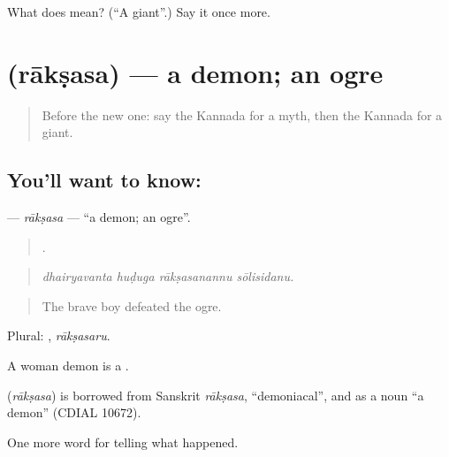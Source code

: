 \begin{tcolorbox}[breakable,colback=teal!4,colframe=teal!35!black,title={Before you move on}]
What does  mean? (\textquotedblleft{}A giant\textquotedblright{}.) Say it once more.
\end{tcolorbox}
\section[\texorpdfstring{\kn{ರಾಕ್ಷಸ} (rākṣasa)}{ರಾಕ್ಷಸ (rākṣasa)}]{ (rākṣasa) — a demon; an ogre}

\label{lesson:KA-C340-raksasa}



\begin{quote}
Before the new one: say the Kannada for a myth, then the Kannada for a giant.
\end{quote}

\subsection*{You'll want to know: }
\textbf{} — \emph{rākṣasa} — \textquotedblleft{}a demon; an ogre\textquotedblright{}.

\begin{quote}
   .
\end{quote}

\begin{quote}
\emph{dhairyavanta huḍuga rākṣasanannu sōlisidanu.}
\end{quote}

\begin{quote}
The brave boy defeated the ogre.
\end{quote}

Plural: , \emph{rākṣasaru}.

A woman demon is a .

\begin{cousinweb}
\textbf{} (\emph{rākṣasa}) is borrowed from Sanskrit \emph{rākṣasa}, \textquotedblleft{}demoniacal\textquotedblright{}, and as a noun \textquotedblleft{}a demon\textquotedblright{} (CDIAL 10672).
\end{cousinweb}

\begin{grammarlens}[title={What you've built}]
One more word for telling what happened.
\end{grammarlens}

